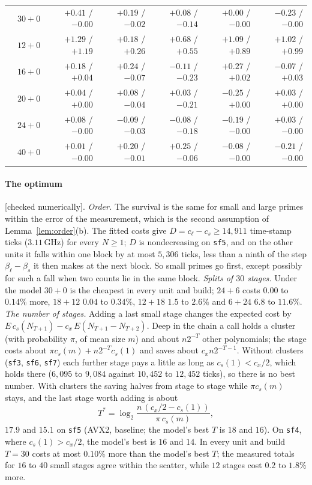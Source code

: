 \documentclass[10pt,a4paper]{article}
\newcommand{\code}[1]{\texttt{#1}}
\newcommand{\stnum}{\textsf{\small[checked numerically]}\xspace}
\theoremstyle{plain}
\theoremstyle{definition}
\begin{document}
\begin{table}[ht]
\begin{tabular}{@{}llrrrrr@{}}
     & $30+0$  & $+0.41$ / $-0.00$ & $+0.19$ / $-0.02$ & $+0.08$ / $-0.14$ & $+0.00$ / $-0.00$ & $-0.23$ / $-0.00$ \\
     & $12+0$  & $+1.29$ / $+1.19$ & $+0.18$ / $+0.26$ & $+0.68$ / $+0.55$ & $+1.09$ / $+0.89$ & $+1.02$ / $+0.99$ \\
     & $16+0$  & $+0.18$ / $+0.04$ & $+0.24$ / $-0.07$ & $-0.11$ / $-0.23$ & $+0.27$ / $+0.02$ & $-0.07$ / $+0.03$ \\
     & $20+0$  & $+0.04$ / $+0.00$ & $+0.08$ / $-0.04$ & $+0.03$ / $-0.21$ & $-0.25$ / $+0.00$ & $+0.03$ / $+0.00$ \\
     & $24+0$  & $+0.08$ / $-0.00$ & $-0.09$ / $-0.03$ & $-0.08$ / $-0.18$ & $-0.19$ / $-0.00$ & $+0.03$ / $-0.00$ \\
     & $40+0$  & $+0.01$ / $-0.00$ & $+0.20$ / $-0.01$ & $+0.25$ / $-0.06$ & $-0.08$ / $-0.00$ & $-0.21$ / $-0.00$ \\
\bottomrule
\end{tabular}
\end{table}

\paragraph{The optimum} \stnum.  \emph{Order.}  The survival is the same for small and large primes within the error of the measurement, which is the second
assumption of Lemma~\ref{lem:order}(b).  The fitted costs give $D=c_\ell-c_s\ge14{,}911$ time-stamp ticks ($3.11$\,GHz) for every $N\ge1$; $D$ is nondecreasing on
\code{sf5}, and on the other units it falls within one block by at most $5{,}306$ ticks, less than a ninth of the step $\beta_\ell-\beta_s$ it then makes at the next
block.  So small primes go first, except possibly for such a fall when two counts lie in the same block.  \emph{Splits of $30$ stages.}  Under the model $30+0$ is the
cheapest in every unit and build; $24+6$ costs $0.00$ to $0.14\%$ more, $18+12$ $0.04$ to $0.34\%$, $12+18$ $1.5$ to $2.6\%$ and $6+24$ $6.8$ to $11.6\%$.
\emph{The number of stages.}  Adding a last small stage changes the expected cost by $E\,c_s(N_{T+1})-c_x\,E(N_{T+1}-N_{T+2})$.  Deep in the chain a call holds a cluster
(with probability $\pi$, of mean size $m$) and about $n2^{-T}$ other polynomials; the stage costs about $\pi c_s(m)+n2^{-T}c_s(1)$ and saves about $c_xn2^{-T-1}$.
Without clusters (\code{sf3}, \code{sf6}, \code{sf7}) each further stage pays a little as long as $c_s(1)<c_x/2$, which holds there ($6{,}095$ to $9{,}084$ against
$10{,}452$ to $12{,}452$ ticks), so there is no best number.  With clusters the saving halves from stage to stage while $\pi c_s(m)$ stays, and the last stage worth
adding is about
\[
T^\ast=\log_2\frac{n\,(c_x/2-c_s(1))}{\pi\,c_s(m)},
\]
$17.9$ and $15.1$ on \code{sf5} (AVX2, baseline; the model's best $T$ is $18$ and $16$).  On \code{sf4}, where $c_s(1)>c_x/2$, the model's best is $16$ and $14$.  In
every unit and build $T=30$ costs at most $0.10\%$ more than the model's best $T$; the measured totals for $16$ to $40$ small stages agree within the scatter, while
$12$ stages cost $0.2$ to $1.8\%$ more.
\end{document}
